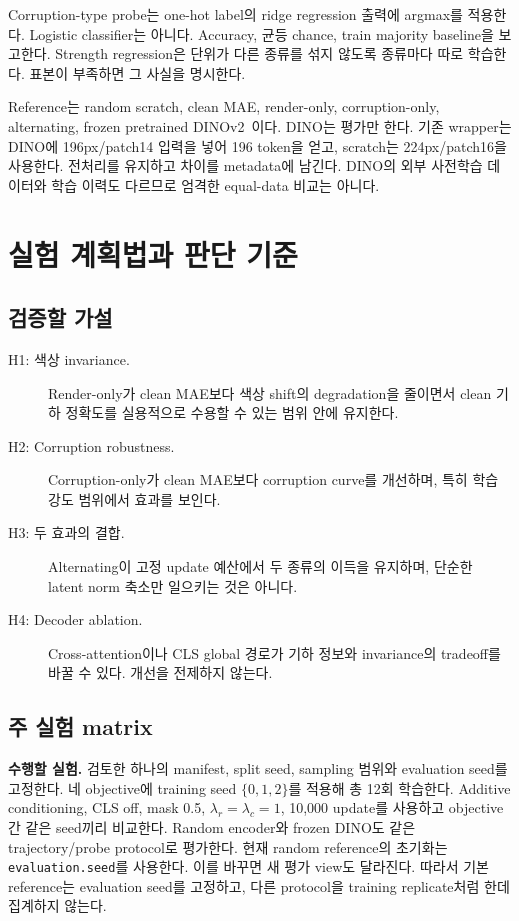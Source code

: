 \documentclass[11pt,a4paper]{article}
\newcommand{\code}[1]{\nolinkurl{#1}}
\newcommand{\plan}{\textbf{수행할 실험.} }
\begin{document}
Corruption-type probe는 one-hot label의 ridge regression 출력에 argmax를
적용한다. Logistic classifier는 아니다. Accuracy, 균등 chance,
train majority baseline을 보고한다. Strength regression은 단위가 다른 종류를
섞지 않도록 종류마다 따로 학습한다. 표본이 부족하면 그 사실을 명시한다.

Reference는 random scratch, clean MAE, render-only, corruption-only,
alternating, frozen pretrained DINOv2~\cite{dinov2}이다. DINO는 평가만 한다.
기존 wrapper는 DINO에 196px/patch14 입력을 넣어 196 token을 얻고, scratch는
224px/patch16을 사용한다. 전처리를 유지하고 차이를 metadata에 남긴다.
DINO의 외부 사전학습 데이터와 학습 이력도 다르므로 엄격한 equal-data 비교는 아니다.

\section{실험 계획법과 판단 기준}
\subsection{검증할 가설}
\begin{description}
\item[H1: 색상 invariance.] Render-only가 clean MAE보다 색상 shift의 degradation을
줄이면서 clean 기하 정확도를 실용적으로 수용할 수 있는 범위 안에 유지한다.
\item[H2: Corruption robustness.] Corruption-only가 clean MAE보다 corruption
curve를 개선하며, 특히 학습 강도 범위에서 효과를 보인다.
\item[H3: 두 효과의 결합.] Alternating이 고정 update 예산에서 두 종류의 이득을
유지하며, 단순한 latent norm 축소만 일으키는 것은 아니다.
\item[H4: Decoder ablation.] Cross-attention이나 CLS global 경로가 기하 정보와
invariance의 tradeoff를 바꿀 수 있다. 개선을 전제하지 않는다.
\end{description}

\subsection{주 실험 matrix}
\plan 검토한 하나의 manifest, split seed, sampling 범위와 evaluation seed를
고정한다. 네 objective에 training seed $\{0,1,2\}$를 적용해 총 12회 학습한다.
Additive conditioning, CLS off, mask 0.5, $\lambda_r=\lambda_c=1$,
10,000 update를 사용하고 objective 간 같은 seed끼리 비교한다.
Random encoder와 frozen DINO도 같은 trajectory/probe protocol로 평가한다.
현재 random reference의 초기화는 \code{evaluation.seed}를 사용한다. 이를 바꾸면
새 평가 view도 달라진다. 따라서 기본 reference는 evaluation seed를 고정하고,
다른 protocol을 training replicate처럼 한데 집계하지 않는다.
\end{document}
